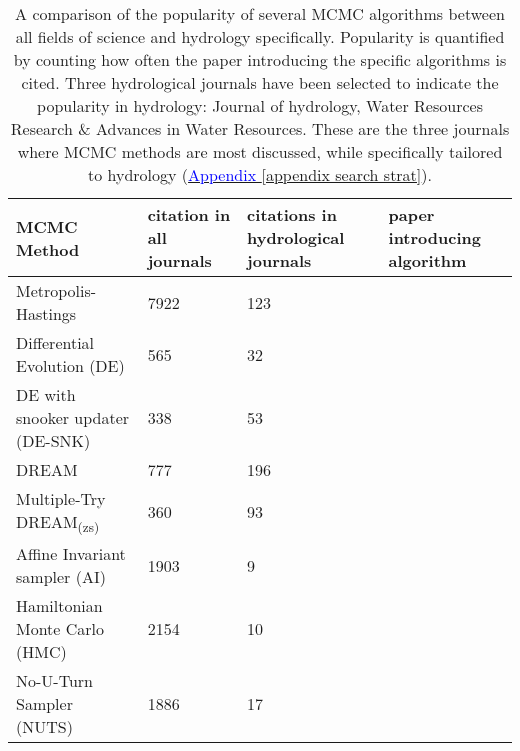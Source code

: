 \begin{table*}[hbt!]
\caption{A comparison of the popularity of several MCMC algorithms between all fields of science and hydrology specifically. Popularity is quantified by counting how often the paper introducing the specific algorithms is cited. Three hydrological journals have been selected to indicate the popularity in hydrology: Journal of hydrology, Water Resources Research \& Advances in Water Resources.  These are the three journals where MCMC methods are most discussed, while  specifically tailored to hydrology (\hyperref[appendix search strat]{\textcolor{blue}{Appendix }\ref{appendix search strat}}).}
\label{tab1}
\begin{tabularx}{\textwidth}{lXXl} 
    \toprule
    MCMC Method & citation in all journals & citations in hydrological journals & paper introducing algorithm\\
    \midrule
    Metropolis-Hastings & 7922 & 123 & \cite{hastings1970monte}\\
    Differential Evolution (DE) & 565 & 32 & \cite{terbraak2006markov}\\
    DE with snooker updater (DE-SNK) & 338 & 53 & \cite{terbraak2008differential}\\
    DREAM & 777 & 196 & \cite{vrugt2009accelerating}\\
    Multiple-Try DREAM\textsubscript{(zs)} & 360 & 93\phantom{0} & \cite{laloy2012high}\\
    Affine Invariant sampler (AI) & 1903 & 9\phantom{0}\phantom{0} & \cite{goodman2010ensemble} \\
    Hamiltonian Monte Carlo (HMC) & 2154 & 10\phantom{0} & \cite{duane1987hybrid}\\
    No-U-Turn Sampler (NUTS) & 1886 & 17\phantom{0} & \cite{hoffman2014no}\\ 
    \bottomrule
\end{tabularx}
\end{table*}

